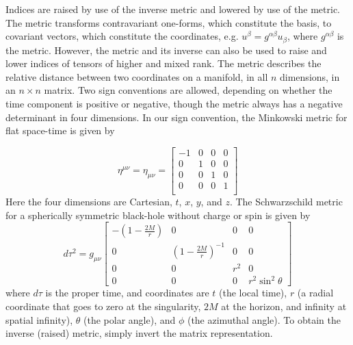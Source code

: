 Indices are raised by use of the inverse metric and lowered by use of the metric. The metric transforms contravariant one-forms, which constitute the basis, to covariant vectors, which constitute the coordinates, e.g. $u^\beta=g^{\alpha\beta}u_\beta$, where $g^{\alpha\beta}$ is the metric. However, the metric and its inverse can also be used to raise and lower indices of tensors of higher and mixed rank. The metric describes the relative distance between two coordinates on a manifold, in all $n$ dimensions, in an $n\times n$ matrix. Two sign conventions are allowed, depending on whether the time component is positive or negative, though the metric always has a negative determinant in four dimensions. In our sign convention, the Minkowski metric for flat space-time is given by


\[
\eta^{\mu\nu}=\eta_{\mu\nu}=
\begin{bmatrix}
  -1 & 0 & 0 & 0\\
  0 & 1 & 0 & 0\\
  0 & 0 & 1 & 0\\
  0 & 0 & 0 & 1\\
\end{bmatrix}
\]
Here the four dimensions are Cartesian, $t$, $x$, $y$, and $z$. The Schwarzschild metric for a spherically symmetric black-hole without charge or spin is given by
\[
d\tau^2=g_{\mu\nu}
\begin{bmatrix}
  -(1-\frac{2M}{r}) & 0 & 0 & 0\\
  0 & (1-\frac{2M}{r})^{-1} & 0 &0\\
  0 & 0 & r^2 & 0\\
  0 & 0 & 0 & r^2\sin^2\theta
\end{bmatrix}
\]
where $d\tau$ is the proper time, and coordinates are $t$ (the local time), $r$ (a radial coordinate that goes to zero at the singularity, $2M$ at the horizon, and infinity at spatial infinity), $\theta$ (the polar angle), and $\phi$ (the azimuthal angle). To obtain the inverse (raised) metric, simply invert the matrix representation.



